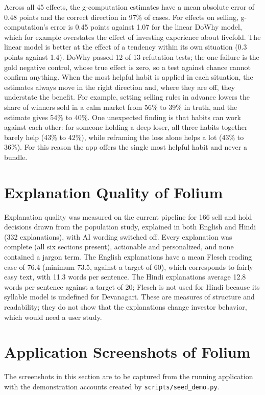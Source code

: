 Across all 45 effects, the g-computation estimates have a mean absolute error of 0.48 points and the correct direction in 97\% of cases. For effects on selling, g-computation's error is 0.45 points against 1.07 for the linear DoWhy model, which for example overstates the effect of investing experience about fivefold. The linear model is better at the effect of a tendency within its own situation (0.3 points against 1.4). DoWhy passed 12 of 13 refutation tests; the one failure is the gold negative control, whose true effect is zero, so a test against chance cannot confirm anything. When the most helpful habit is applied in each situation, the estimates always move in the right direction and, where they are off, they understate the benefit. For example, setting selling rules in advance lowers the share of winners sold in a calm market from 56\% to 39\% in truth, and the estimate gives 54\% to 40\%. One unexpected finding is that habits can work against each other: for someone holding a deep loser, all three habits together barely help (43\% to 42\%), while reframing the loss alone helps a lot (43\% to 36\%). For this reason the app offers the single most helpful habit and never a bundle.

\section{Explanation Quality of Folium}
Explanation quality was measured on the current pipeline for 166 sell and hold decisions drawn from the population study, explained in both English and Hindi (332 explanations), with AI wording switched off. Every explanation was complete (all six sections present), actionable and personalized, and none contained a jargon term. The English explanations have a mean Flesch reading ease of 76.4 (minimum 73.5, against a target of 60), which corresponds to fairly easy text, with 11.3 words per sentence. The Hindi explanations average 12.8 words per sentence against a target of 20; Flesch is not used for Hindi because its syllable model is undefined for Devanagari. These are measures of structure and readability; they do not show that the explanations change investor behavior, which would need a user study.

\section{Application Screenshots of Folium}
The screenshots in this section are to be captured from the running application with the demonstration accounts created by \texttt{scripts/seed\_demo.py}.

